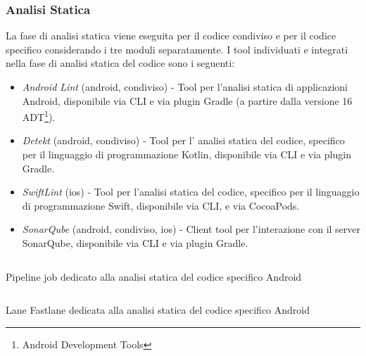 \subsubsection{Analisi Statica}
La fase di analisi statica viene eseguita per il codice condiviso e per il codice specifico considerando i tre moduli separatamente. I tool individuati e integrati nella fase di analisi statica del codice sono i seguenti:
\begin{itemize}
    \item \textit{Android Lint} (android, condiviso) - Tool per l'analisi statica di applicazioni Android, disponibile via CLI e via plugin Gradle (a partire dalla versione 16 ADT\footnote{Android Development Tools}).
    \item \textit{Detekt} (android, condiviso) - Tool per l' analisi statica del codice, specifico per il linguaggio di programmazione Kotlin, disponibile via CLI e via plugin Gradle.
    \item \textit{SwiftLint} (ios) - Tool per l'analisi statica del codice, specifico per il linguaggio di programmazione Swift, disponibile via CLI, e via CocoaPods.
    \item \textit{SonarQube} (android, condiviso, ios) - Client tool per l'interazione con il server SonarQube, disponibile via CLI e via plugin Gradle.
\end{itemize}

\begin{listing}[H]
\inputminted{yaml}{code/4-sastjob}
\caption{Pipeline job dedicato alla analisi statica del codice specifico Android}
\end{listing}

\begin{listing}[H]
\inputminted{ruby}{code/4-sastfastlane}
\caption{Lane Fastlane dedicata alla analisi statica del codice specifico Android}
\end{listing}

